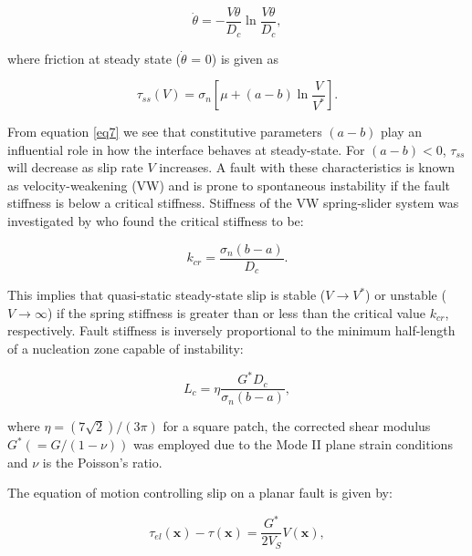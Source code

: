 \documentclass[preprint,1p, 10pt,authoryear]{elsarticle}
\begin{document}
\begin{equation}
\label{eq6}
\dot{\theta} = - \frac{V\theta}{D_{c}}\ln\frac{V\theta}{D_{c}},
\end{equation}   

\noindent where friction at steady state ($\dot{\theta} $ = 0) is given as

\begin{equation}
\label{eq7}
\tau_{ss} \left( V \right) = \sigma_{n} \left[\mu + \left(a - b \right)\ln\frac{V}{V^{*}}\right].
\end{equation}   

\noindent From equation \eqref{eq7} we see that constitutive parameters $\left(a - b \right)$ play an influential role in how the interface behaves at steady-state.  For $\left(a - b \right) < 0$, $\tau_{ss}$ will decrease as slip rate $V$ increases.  A fault with these characteristics is known as velocity-weakening (VW) and is prone to spontaneous instability if the fault stiffness is below a critical stiffness. Stiffness of the VW spring-slider system was investigated by \citet{Ranjith1999} who found the critical stiffness to be:

\begin{equation}
\label{eq9}
k_{cr}=\frac{\sigma_{n} \left( b-a \right)}{D_{c}}.
\end{equation}   

\noindent  This implies that quasi-static steady-state slip is stable ($V \rightarrow V^{*}$) or unstable ($V \rightarrow \infty$) if the spring stiffness is greater than or less than the critical value $k_{cr}$, respectively. Fault stiffness is inversely proportional to the minimum half-length of a nucleation zone capable of instability:

\begin{equation}
\label{eq8}
L_{c} = \eta \frac{G^{*} D_{c}}{ \sigma_{n} \left( b-a\right)},
\end{equation}   

\noindent where $\eta = (7\sqrt{2})/(3\pi)$ \citep{Dieterich1992} for a square patch, the corrected shear modulus $G^{*} (= G/(1-\nu))$ was employed due to the Mode II plane strain conditions and $\nu$ is the Poisson's ratio. 

The equation of motion controlling slip on a planar fault is given by:

\begin{equation}
\label{eq8a}
\tau_{el}\left( \mathbf{x} \right) - \tau\left( \mathbf{x} \right) = \frac{G^{*}}{2 V_{S}} V(\mathbf{x}),
\end{equation}  
\end{document}
